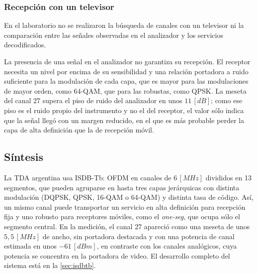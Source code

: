 \subsubsection*{Recepción con un televisor}
En el laboratorio no se realizaron la búsqueda de canales con un televisor ni la comparación entre las señales observadas en el analizador y los servicios decodificados.

La presencia de una señal en el analizador no garantiza su recepción. El receptor necesita un nivel por encima de su sensibilidad y una relación portadora a ruido suficiente para la modulación de cada capa, que es mayor para las modulaciones de mayor orden, como 64-QAM, que para las robustas, como QPSK. La meseta del canal 27 supera el piso de ruido del analizador en unos $11 \, [dB]$; como ese piso es el ruido propio del instrumento y no el del receptor, el valor sólo indica que la señal llegó con un margen reducido, en el que es más probable perder la capa de alta definición que la de recepción móvil.

\subsection{Síntesis}
La TDA argentina usa ISDB-Tb: OFDM en canales de $6 \, [MHz]$ divididos en 13 segmentos, que pueden agruparse en hasta tres capas jerárquicas con distinta modulación (DQPSK, QPSK, 16-QAM o 64-QAM) y distinta tasa de código. Así, un mismo canal puede transportar un servicio en alta definición para recepción fija y uno robusto para receptores móviles, como el \textit{one-seg}, que ocupa sólo el segmento central. En la medición, el canal 27 apareció como una meseta de unos $5{,}5 \, [MHz]$ de ancho, sin portadora destacada y con una potencia de canal estimada en unos $-61 \, [dBm]$, en contraste con los canales analógicos, cuya potencia se concentra en la portadora de video. El desarrollo completo del sistema está en la \autoref{sec:isdbtb}.